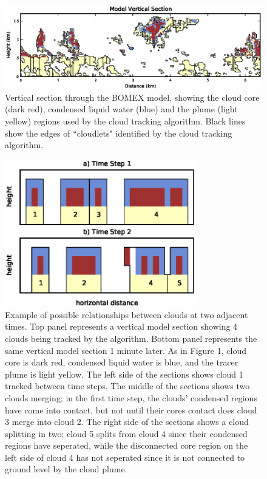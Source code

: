 \documentclass[acp]{copernicus}
\begin{document}
\begin{figure}[t]
\vspace*{2mm}
\begin{center}
\includegraphics[width=\textwidth]{./figures/vertical_section}
\end{center}
\caption{Vertical section through the BOMEX model, showing the cloud core
(dark red), condensed liquid water (blue) and the plume (light yellow) regions 
used by the cloud tracking algorithm. Black lines show the edges of 
``cloudlets" identified by the cloud tracking algorithm.}
\label{fig:vertical_section}
\end{figure}

\begin{figure}[t]
\vspace*{2mm}
\begin{center}
\includegraphics[width=8.3cm]{./figures/cloudfinder_instructions}
\end{center}
\caption{Example of possible relationships between clouds at two adjacent 
times.  Top panel represents a vertical model section showing 4 clouds being 
tracked by the algorithm. Bottom panel represents the same vertical model 
section 1 minute later. As in Figure 1, cloud core is dark red, condensed 
liquid water is blue, and the tracer plume is light yellow.  The left side of 
the sections shows cloud 1 tracked between time steps.  The middle of the 
sections shows two clouds merging; in the first time step, the clouds' 
condensed regions have come into contact, but not until their cores contact 
does cloud 3 merge into cloud 2. The right side of the sections shows a cloud 
splitting in two; cloud 5 splits from cloud 4 since their condensed regions 
have seperated, while the disconnected core region on the left side of cloud 4 
has not seperated since it is not connected to ground level by the cloud 
plume.}
\label{fig:cloudfinder_instructions}
\end{figure}
\end{document}
